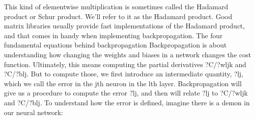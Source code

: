 This kind of elementwise multiplication is sometimes called the Hadamard product or Schur product. We'll refer to it as the Hadamard product. Good matrix libraries usually provide fast implementations of the Hadamard product, and that comes in handy when implementing backpropagation.
The four fundamental equations behind backpropagation
Backpropagation is about understanding how changing the weights and biases in a network changes the cost function. Ultimately, this means computing the partial derivatives ?C/?wljk and ?C/?blj. But to compute those, we first introduce an intermediate quantity, ?lj, which we call the error in the jth neuron in the lth layer. Backpropagation will give us a procedure to compute the error ?lj, and then will relate ?lj to ?C/?wljk and ?C/?blj.
To understand how the error is defined, imagine there is a demon in our neural network: 

